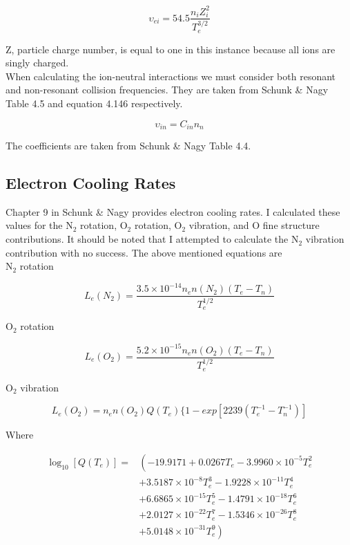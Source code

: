 \documentclass[10pt]{article}
\begin{document}
\begin{equation}
\upsilon _{ei}= 54.5\frac{n_{i}Z_{i}^{2}}{T_{e}^{3/2}}
\end{equation}

\noindent Z, particle charge number, is equal to one in this instance because all ions are singly charged.
\\

\noindent When calculating the ion-neutral interactions we must consider both resonant and non-resonant collision frequencies.  They are taken from Schunk \& Nagy Table 4.5 and equation 4.146 respectively.

\begin{equation}
\upsilon _{in}= C_{in}n_{n}
\end{equation}

\noindent The coefficients are taken from Schunk \& Nagy Table 4.4.

\subsection{Electron Cooling Rates}
Chapter 9 in Schunk \& Nagy provides electron cooling rates. I calculated these values for the N$_{2}$ rotation, O$_{2}$ rotation, O$_{2}$ vibration, and O fine structure contributions. It should be noted that I attempted to calculate the N$_{2}$ vibration contribution with no success. The above mentioned equations are
\\

\noindent N$_{2}$ rotation 

\begin{equation}
L_{e}(N_{2})=\frac{3.5 \times 10^{-14}n_{e}n(N_{2})(T_{e}-T_{n})}{T_{e}^{1/2}} 
\end{equation}

\noindent O$_{2}$ rotation

\begin {equation}
L_{e}(O_{2})=\frac{5.2 \times 10^{-15}n_{e}n(O_{2})(T_{e}-T_{n})}{T_{e}^{1/2}} 
\end {equation}

\noindent O$_{2}$ vibration

\begin{equation}
L_{e}(O_{2})=n_{e}n(O_{2})Q(T_{e})\{1-exp{[2239(T_{e}^{-1}-T_{n}^{-1})]}
\end{equation}

\noindent Where

\begin{equation}
\begin{split}
\log _{10} [Q(T_{e})] =& \left( -19.9171 + 0.0267T_{e} - 3.9960 \times 10^{-5}T_{e}^{2} \right. \\ & \left. 
+ 3.5187 \times 10^{-8}T_{e}^{3} - 1.9228 \times 10^{-11}T_{e}^{4} \right. \\ & \left. 
+ 6.6865 \times 10^{-15}T_{e}^{5} - 1.4791 \times 10^{-18}T_{e}^{6} \right. \\ & \left. 
+ 2.0127 \times 10^{-22}T_{e}^{7} - 1.5346 \times 10^{-26}T_{e}^{8} \right. \\ & \left. 
+ 5.0148 \times 10^{-31}T_{e}^{9} \right)
\end{split}
\end{equation}
\end{document}
